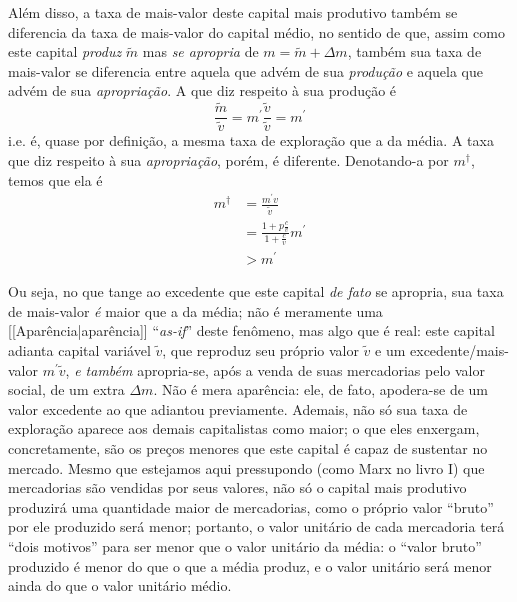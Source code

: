 Além disso, a taxa de mais-valor deste capital mais produtivo também se diferencia da taxa de mais-valor do capital médio, no sentido de que, assim como este capital \textit{produz} $\tilde{m}$ mas \textit{se apropria} de $m = \tilde{m} + \Delta m$, também sua taxa de mais-valor se diferencia entre aquela que advém de sua \textit{produção} e aquela que advém de sua \textit{apropriação}. A que diz respeito à sua produção é
$$
\frac{\tilde{m}}{\tilde{v}} = m^{\prime} \frac{\tilde{v}}{\tilde{v}} = m^{\prime}
$$
i.e. é, quase por definição, a mesma taxa de exploração que a da média. A taxa que diz respeito à sua \textit{apropriação}, porém, é diferente. Denotando-a por $m^{\dagger}$, temos que ela é
\begin{align*}
m^{\dagger} &= \frac{m^{\prime}v}{\tilde{v}}\\
&= \frac{1+p \frac{c}{v}}{1+\frac{c}{v}} m^{\prime} \\
&> m^{\prime}
\end{align*}

Ou seja, no que tange ao excedente que este capital \textit{de fato} se apropria, sua taxa de mais-valor \textit{é} maior que a da média; não é meramente uma [[Aparência|aparência]] ``\textit{as-if}'' deste fenômeno, mas algo que é real: este capital adianta capital variável $\tilde{v}$, que reproduz seu próprio valor $\tilde{v}$ e um excedente/mais-valor $m^{\prime}\tilde{v}$, \textit{e também} apropria-se, após a venda de suas mercadorias pelo valor social, de um extra $\Delta m$. Não é mera aparência: ele, de fato, apodera-se de um valor excedente ao que adiantou previamente. Ademais, não só sua taxa de exploração aparece aos demais capitalistas como maior; o que eles enxergam, concretamente, são os preços menores que este capital é capaz de sustentar no mercado. Mesmo que estejamos aqui pressupondo (como Marx no livro I) que mercadorias são vendidas por seus valores, não só o capital mais produtivo produzirá uma quantidade maior de mercadorias, como o próprio valor ``bruto'' por ele produzido será menor; portanto, o valor unitário de cada mercadoria terá ``dois motivos'' para ser menor que o valor unitário da média: o ``valor bruto'' produzido é menor do que o que a média produz, e o valor unitário será menor ainda do que o valor unitário médio.

